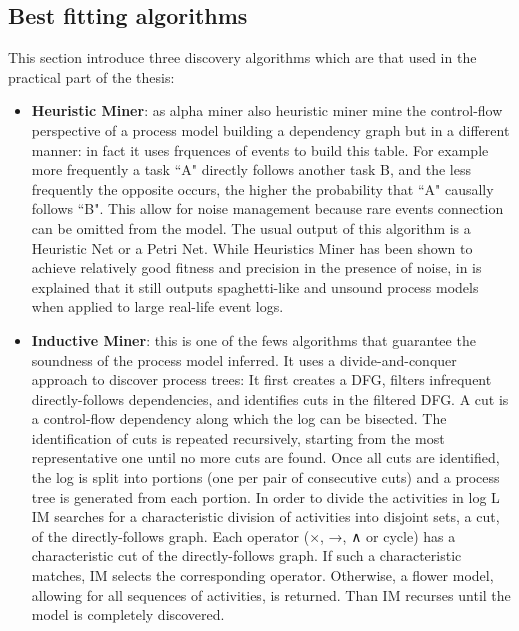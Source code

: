 \subsection{Best fitting algorithms}
This section introduce three discovery algorithms which are that used in the practical part of the thesis:

\begin{itemize}

    \item \textbf{Heuristic Miner}:
    as alpha miner also heuristic miner mine the control-flow perspective of a process model building a dependency graph 
    but in a different manner: in fact it uses frquences of events to build this table. For example more 
    frequently a task ``A" directly follows another task B, and the less frequently the opposite occurs, the higher the 
    probability that ``A" causally follows ``B". This allow for noise management because rare events connection can be 
    omitted from the model. The usual output of this algorithm is a Heuristic Net or a Petri Net. While Heuristics Miner has 
    been shown to achieve relatively good fitness and precision in the presence of noise, in \cite{DBLP:conf/icdm/SplitMiner} is explained 
    that it still outputs spaghetti-like and unsound process models when applied to large real-life event logs.

    \item \textbf{Inductive Miner}:
    this is one of the fews algorithms that guarantee the soundness of the process model inferred. It uses a divide-and-conquer 
    approach to discover process trees: It first creates a DFG, filters infrequent directly-follows dependencies, and identifies 
    cuts in the filtered DFG. A cut is a control-flow dependency along which the log can be bisected. The identification of cuts 
    is repeated recursively, starting from the most representative one until no more cuts are found. Once all cuts are 
    identified, the log is split into portions (one per pair of consecutive cuts) and a process tree is generated from each 
    portion.
    In order to divide the activities in log L IM searches for a characteristic division of activities into disjoint sets, a cut, 
    of the directly-follows graph. Each operator (×, →, ∧ or cycle) has a characteristic cut of the directly-follows graph. 
    If such a characteristic matches, IM selects the corresponding operator. Otherwise, a flower model, allowing for all 
    sequences of activities, is returned. Than IM recurses until the model is completely discovered.
    


\end{itemize}
